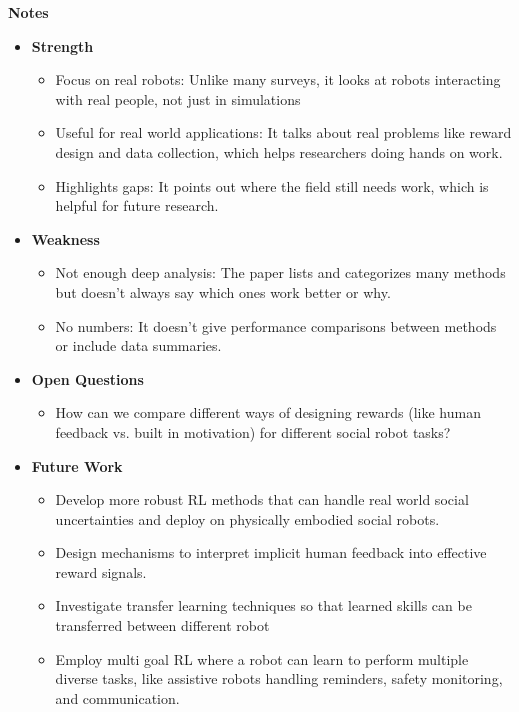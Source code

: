 \documentclass[report.tex]{subfiles}
\begin{document}
\noindent\textbf{Notes}
\begin{itemize}
    \item \noindent\textbf {Strength}
    \begin{itemize}
        \item Focus on real robots: Unlike many surveys, it looks at robots interacting with real people, not just in simulations
        \item Useful for real world applications: It talks about real problems like reward design and data collection, which helps researchers doing hands on work.
        \item Highlights gaps: It points out where the field still needs work, which is helpful for future research.
        
       
    \end{itemize}
    
    \item \noindent\textbf{Weakness}
    \begin{itemize}
        \item Not enough deep analysis: The paper lists and categorizes many methods but doesn't always say which ones work better or why.
        \item No numbers: It doesn’t give performance comparisons between methods or include data summaries.
    \end{itemize}
\end{itemize}

\begin{itemize}
    \item \noindent\textbf {Open Questions}
    \begin{itemize}
        \item     How can we compare different ways of designing rewards (like human feedback vs. built in motivation) for different social robot tasks?

    \end{itemize}
    
    \item \noindent\textbf{Future Work}
    \begin{itemize}
        \item Develop more robust RL methods that can handle real world social uncertainties and deploy on physically embodied social robots.
        \item Design mechanisms to interpret implicit human feedback into effective reward signals.
        \item Investigate transfer learning techniques so that learned skills can be transferred between different robot
        \item Employ multi goal RL where a robot can learn to perform multiple diverse tasks, like assistive robots handling reminders, safety monitoring, and communication.
        
    \end{itemize}
\end{itemize}
\end{document}
